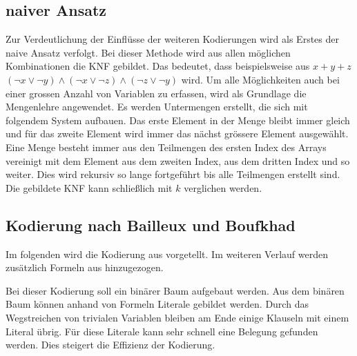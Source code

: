 \documentclass[a4,abstract=on]{scrartcl}
\begin{document}

	\subsection{naiver Ansatz}
Zur Verdeutlichung der Einflüsse der weiteren Kodierungen wird als Erstes der naive Ansatz verfolgt. Bei dieser Methode wird aus allen möglichen Kombinationen die KNF gebildet. Das bedeutet, dass beispielsweise aus $x+y+z$ $(\neg x \vee \neg y) \wedge (\neg x \vee \neg z) \wedge (\neg z \vee \neg y)$ wird. Um alle Möglichkeiten auch bei einer grossen Anzahl von Variablen zu erfassen, wird als Grundlage die Mengenlehre angewendet. Es werden Untermengen erstellt, die sich mit folgendem System aufbauen. Das erste Element in der Menge bleibt immer gleich und für das zweite Element wird immer das nächst grössere Element ausgewählt. Eine Menge besteht immer aus den Teilmengen des ersten Index des Arrays vereinigt mit dem Element aus dem zweiten Index, aus dem dritten Index und so weiter. Dies wird rekursiv so lange fortgeführt bis alle Teilmengen erstellt sind. Die gebildete KNF kann schließlich mit $k$ verglichen werden.

	\subsection{Kodierung nach Bailleux und Boufkhad}
Im folgenden wird die Kodierung aus \cite[][]{bailleux} vorgetellt. Im weiteren Verlauf werden zusätzlich Formeln aus \cite[][]{knuth} hinzugezogen.

Bei dieser Kodierung soll ein binärer Baum aufgebaut werden. Aus dem binären Baum können anhand von Formeln Literale gebildet werden. Durch das Wegstreichen von trivialen Variablen bleiben am Ende einige Klauseln mit einem Literal übrig. Für diese Literale kann sehr schnell eine Belegung gefunden werden. Dies steigert die Effizienz der Kodierung.
\end{document}
